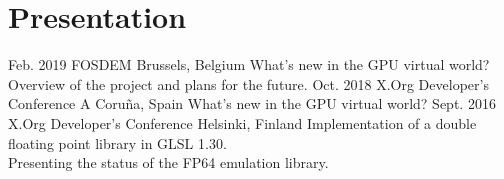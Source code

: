 \documentclass[]{Elie-cv}
\begin{document}
\section{Presentation}

\begin{entrylist}
  \entry
    {Feb. 2019}
    {FOSDEM}
    {Brussels, Belgium}
    {What's new in the GPU virtual world?\\
    Overview of the project and plans for the future.}
   \entry
    {Oct. 2018}
    {X.Org Developer's Conference}
    {A Coruña, Spain}
    {What's new in the GPU virtual world?}
   \entry
    {Sept. 2016}
    {X.Org Developer's Conference}
    {Helsinki, Finland}
    {Implementation of a double floating point library in GLSL 1.30.\\
    Presenting the status of the FP64 emulation library.}
\end{entrylist}
\end{document}
